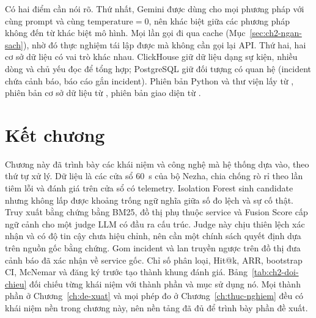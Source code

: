 Có hai điểm cần nói rõ. Thứ nhất, Gemini được dùng cho mọi phương pháp với cùng prompt và cùng $\text{temperature} = 0$, nên khác biệt giữa các phương pháp không đến từ khác biệt mô hình. Mọi lần gọi đi qua cache (Mục~\ref{sec:ch2-ngan-sach}), nhờ đó thực nghiệm tái lập được mà không cần gọi lại API. Thứ hai, hai cơ sở dữ liệu có vai trò khác nhau. ClickHouse giữ dữ liệu dạng sự kiện, nhiều dòng và chủ yếu đọc để tổng hợp; PostgreSQL giữ đối tượng có quan hệ (incident chứa cảnh báo, báo cáo gắn incident). Phiên bản Python và thư viện lấy từ , phiên bản cơ sở dữ liệu từ , phiên bản giao diện từ .

\section{Kết chương}
\label{sec:ch2-ket-chuong}

Chương này đã trình bày các khái niệm và công nghệ mà hệ thống dựa vào, theo thứ tự xử lý. Dữ liệu là các cửa sổ 60~s của bộ Nezha, chia chống rò rỉ theo lần tiêm lỗi và đánh giá trên cửa sổ có telemetry. Isolation Forest sinh candidate nhưng không lấp được khoảng trống ngữ nghĩa giữa số đo lệch và sự cố thật. Truy xuất bằng chứng bằng BM25, đồ thị phụ thuộc service và Fusion Score cấp ngữ cảnh cho một judge LLM có đầu ra cấu trúc. Judge này chịu thiên lệch xác nhận và có độ tin cậy chưa hiệu chỉnh, nên cần một chính sách quyết định dựa trên nguồn gốc bằng chứng. Gom incident và lan truyền ngược trên đồ thị đưa cảnh báo đã xác nhận về service gốc. Chỉ số phân loại, Hit@k, ARR, bootstrap CI, McNemar và đăng ký trước tạo thành khung đánh giá. Bảng~\ref{tab:ch2-doi-chieu} đối chiếu từng khái niệm với thành phần và mục sử dụng nó. Mọi thành phần ở Chương~\ref{ch:de-xuat} và mọi phép đo ở Chương~\ref{ch:thuc-nghiem} đều có khái niệm nền trong chương này, nên nền tảng đã đủ để trình bày phần đề xuất.

